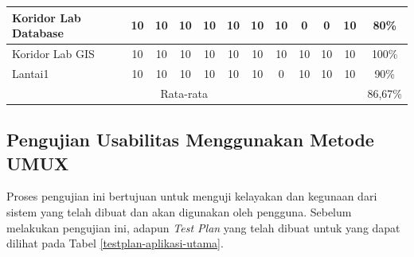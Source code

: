 \begin{enumerate}
\begin{table}[H]
\begin{tabular}{|lccccccccccc|}
			      \multicolumn{1}{|l|}{Koridor Lab Database}                            & \multicolumn{1}{c|}{10}                                 & \multicolumn{1}{c|}{10} & \multicolumn{1}{c|}{10} & \multicolumn{1}{c|}{10} & \multicolumn{1}{c|}{10} & \multicolumn{1}{c|}{10} & \multicolumn{1}{c|}{10} & \multicolumn{1}{c|}{0}  & \multicolumn{1}{c|}{0}  & \multicolumn{1}{c|}{10} & 80\%  \\ \hline
			      \multicolumn{1}{|l|}{Koridor Lab GIS}                                 & \multicolumn{1}{c|}{10}                                 & \multicolumn{1}{c|}{10} & \multicolumn{1}{c|}{10} & \multicolumn{1}{c|}{10} & \multicolumn{1}{c|}{10} & \multicolumn{1}{c|}{10} & \multicolumn{1}{c|}{10} & \multicolumn{1}{c|}{10} & \multicolumn{1}{c|}{10} & \multicolumn{1}{c|}{10} & 100\% \\ \hline
			      \multicolumn{1}{|l|}{Lantai1}                                         & \multicolumn{1}{c|}{10}                                 & \multicolumn{1}{c|}{10} & \multicolumn{1}{c|}{10} & \multicolumn{1}{c|}{10} & \multicolumn{1}{c|}{10} & \multicolumn{1}{c|}{10} & \multicolumn{1}{c|}{0}  & \multicolumn{1}{c|}{10} & \multicolumn{1}{c|}{10} & \multicolumn{1}{c|}{10} & 90\%  \\ \hline
			      \multicolumn{11}{|c|}{Rata-rata}                                      & 86,67\%                                                                                                                                                                                                                                                                                                   \\ \hline
		      \end{tabular}
	      \end{table}

\end{enumerate}

\subsection{Pengujian Usabilitas Menggunakan Metode UMUX}
\par Proses pengujian ini bertujuan untuk menguji kelayakan dan kegunaan dari sistem yang telah dibuat dan akan digunakan oleh pengguna. Sebelum melakukan pengujian ini, adapun \textit{Test Plan} yang telah dibuat untuk yang dapat dilihat pada Tabel \ref{testplan-aplikasi-utama}.

